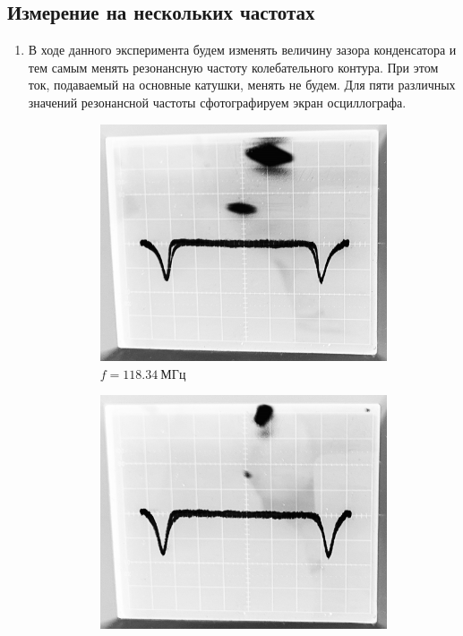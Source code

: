 \documentclass[14pt, a4paper]{report}
\begin{document}
\newpage

\subsection{Измерение на нескольких частотах}

\begin{enumerate}

\item В ходе данного эксперимента будем изменять величину зазора конденсатора и тем самым менять резонансную частоту колебательного контура. При этом ток, подаваемый на основные катушки, менять не будем. Для пяти различных значений резонансной частоты сфотографируем экран осциллографа.

\begin{figure}[H]
\centering
\begin{subfigure}{.5\textwidth}
  \centering
  \includegraphics[width=.95\linewidth]{../images/5101-7e}
  \caption{$f=118.34\ МГц$}
\end{subfigure}%
\begin{subfigure}{.5\textwidth}
  \centering
  \includegraphics[width=.95\linewidth]{../images/5101-7d}

\end{subfigure}
\end{figure}
\end{enumerate}
\end{document}
